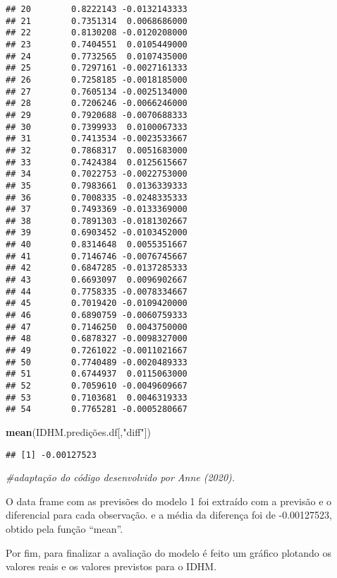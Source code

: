 \documentclass[
]{article}
\newenvironment{Shaded}{\begin{snugshade}}{\end{snugshade}}
\newcommand{\CommentTok}[1]{\textcolor[rgb]{0.56,0.35,0.01}{\textit{#1}}}
\newcommand{\FunctionTok}[1]{\textcolor[rgb]{0.13,0.29,0.53}{\textbf{#1}}}
\newcommand{\NormalTok}[1]{#1}
\newcommand{\StringTok}[1]{\textcolor[rgb]{0.31,0.60,0.02}{#1}}
\begin{document}
\begin{verbatim}
## 20        0.8222143 -0.0132143333
## 21        0.7351314  0.0068686000
## 22        0.8130208 -0.0120208000
## 23        0.7404551  0.0105449000
## 24        0.7732565  0.0107435000
## 25        0.7297161 -0.0027161333
## 26        0.7258185 -0.0018185000
## 27        0.7605134 -0.0025134000
## 28        0.7206246 -0.0066246000
## 29        0.7920688 -0.0070688333
## 30        0.7399933  0.0100067333
## 31        0.7413534 -0.0023533667
## 32        0.7868317  0.0051683000
## 33        0.7424384  0.0125615667
## 34        0.7022753 -0.0022753000
## 35        0.7983661  0.0136339333
## 36        0.7008335 -0.0248335333
## 37        0.7493369 -0.0133369000
## 38        0.7891303 -0.0181302667
## 39        0.6903452 -0.0103452000
## 40        0.8314648  0.0055351667
## 41        0.7146746 -0.0076745667
## 42        0.6847285 -0.0137285333
## 43        0.6693097  0.0096902667
## 44        0.7758335 -0.0078334667
## 45        0.7019420 -0.0109420000
## 46        0.6890759 -0.0060759333
## 47        0.7146250  0.0043750000
## 48        0.6878327 -0.0098327000
## 49        0.7261022 -0.0011021667
## 50        0.7740489 -0.0020489333
## 51        0.6744937  0.0115063000
## 52        0.7059610 -0.0049609667
## 53        0.7103681  0.0046319333
## 54        0.7765281 -0.0005280667
\end{verbatim}

\begin{Shaded}
\begin{Highlighting}[]
\FunctionTok{mean}\NormalTok{(IDHM.predições.df[,}\StringTok{"diff"}\NormalTok{])}
\end{Highlighting}
\end{Shaded}

\begin{verbatim}
## [1] -0.00127523
\end{verbatim}

\begin{Shaded}
\begin{Highlighting}[]
\CommentTok{\#adaptação do código desenvolvido por Anne (2020).}
\end{Highlighting}
\end{Shaded}

O data frame com as previsões do modelo 1 foi extraído com a previsão e
o diferencial para cada observação. e a média da diferença foi de
-0.00127523, obtido pela função ``mean''.

Por fim, para finalizar a avaliação do modelo é feito um gráfico
plotando os valores reais e os valores previstos para o IDHM.
\end{document}

